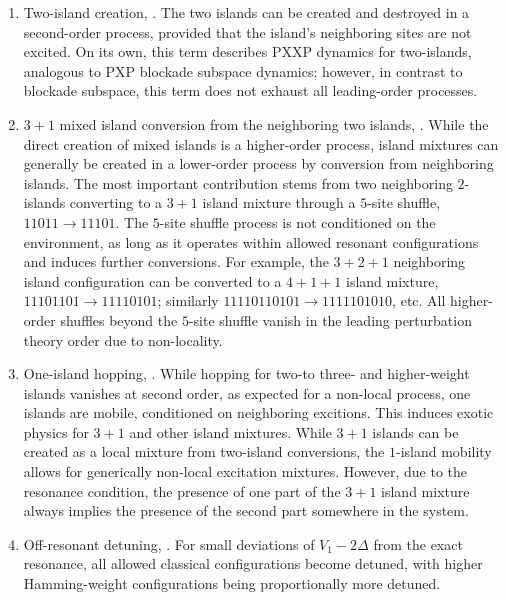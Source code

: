 \documentclass[english,floatfix,twocolumn,showpacs, aps, prx, reprint, superscriptaddress, longbibliography]{revtex4-2}
\begin{document}
\begin{enumerate}[$\bullet$, labelindent=0pt, leftmargin=*, itemsep=0pt, topsep=0pt, parsep=0pt]
\item Two-island creation, . The two islands can be created and destroyed in a second-order process, provided that the island's neighboring sites are not excited. On its own, this term describes PXXP dynamics for two-islands, analogous to PXP blockade subspace dynamics; however, in contrast to blockade subspace, this term does not exhaust all leading-order processes.
\item $3+1$ mixed island conversion from the neighboring two islands, . While the direct creation of mixed islands is a higher-order process, island mixtures can generally be created in a lower-order process by conversion from neighboring islands. The most important contribution stems from two neighboring $2$-islands converting to a $3+1$ island mixture through a $5$-site shuffle, $11011 \rightarrow 11101$. The $5$-site shuffle process is not conditioned on the environment, as long as it operates within allowed resonant configurations and induces further conversions. For example, the $3+2+1$ neighboring island configuration can be converted to a $4+1+1$ island mixture, $11101101 \rightarrow 11110101$; similarly $11110110101 \rightarrow 1111101010$, etc. All higher-order shuffles beyond the $5$-site shuffle vanish in the leading perturbation theory order due to non-locality.
\item One-island hopping, . While hopping for two-to three- and higher-weight islands vanishes at second order, as expected for a non-local process, one islands are mobile, conditioned on neighboring excitions. This induces exotic physics for $3+1$ and other island mixtures. While $3+1$ islands can be created as a local mixture from two-island conversions, the $1$-island mobility allows for generically non-local excitation mixtures. However, due to the resonance condition, the presence of one part of the $3+1$ island mixture always implies the presence of the second part somewhere in the system.
\item Off-resonant detuning, . For small deviations of $V_1 - 2\Delta$ from the exact resonance, all allowed classical configurations become detuned, with higher Hamming-weight configurations being proportionally more detuned. 
\end{enumerate}
\end{document}
